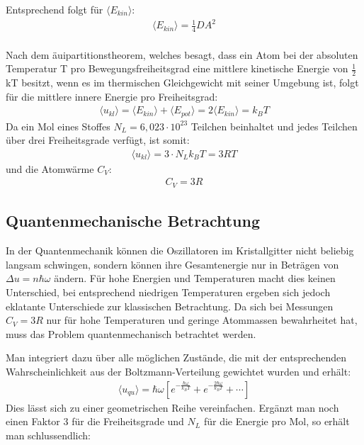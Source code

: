 Entsprechend folgt für $\langle E_{kin}\rangle$:
\begin{align*}
\langle E_{kin}\rangle = \frac{1}{4} DA^2
\end{align*}\\

Nach dem äuipartitionstheorem, welches besagt, dass ein Atom bei der absoluten Temperatur T pro Bewegungsfreiheitsgrad eine
mittlere kinetische Energie von $\frac{1}{2}$ kT besitzt, wenn es im thermischen Gleichgewicht mit seiner Umgebung ist, folgt für die mittlere innere Energie pro Freiheitsgrad:
\begin{align*}
\langle u_{kl} \rangle = \langle E_{kin}\rangle + \langle E_{pot}\rangle = 2\langle E_{kin}\rangle = k_B T
\end{align*}
Da ein Mol eines Stoffes $N_L = 6,023\cdot 10^{23}$ Teilchen beinhaltet und jedes Teilchen über drei Freiheitsgrade verfügt, ist somit:
\begin{align*}
\langle u_{kl} \rangle = 3\cdot N_L k_B T = 3RT
\end{align*}
und die Atomwärme $C_V$:
\begin{align*}
C_V =3R
\end{align*}
\subsection{Quantenmechanische Betrachtung}
In der Quantenmechanik können die Oszillatoren im Kristallgitter nicht beliebig langsam schwingen, sondern können ihre Gesamtenergie nur in Beträgen von $\Delta u = n\hbar \omega$ ändern. Für hohe Energien und Temperaturen macht dies keinen Unterschied, bei entsprechend niedrigen Temperaturen ergeben sich jedoch eklatante Unterschiede zur klassischen Betrachtung. Da sich bei Messungen $C_V = 3R$ nur für hohe Temperaturen und geringe Atommassen bewahrheitet hat, muss das Problem quantenmechanisch betrachtet werden.

Man integriert dazu über alle möglichen Zustände, die mit der entsprechenden Wahrscheinlichkeit aus der Boltzmann-Verteilung gewichtet wurden und erhält:
\begin{align*}
\langle u_{qu} \rangle = \hbar \omega \left[ e^{-\frac{\hbar \omega}{k_BT}} +e^{-\frac{2\hbar \omega}{k_BT}}+\cdots\right]
\end{align*} 
Dies lässt sich zu einer geometrischen Reihe vereinfachen. Ergänzt man noch einen Faktor 3 für die Freiheitsgrade und $N_L$ für die Energie pro Mol, so erhält man schlussendlich:

